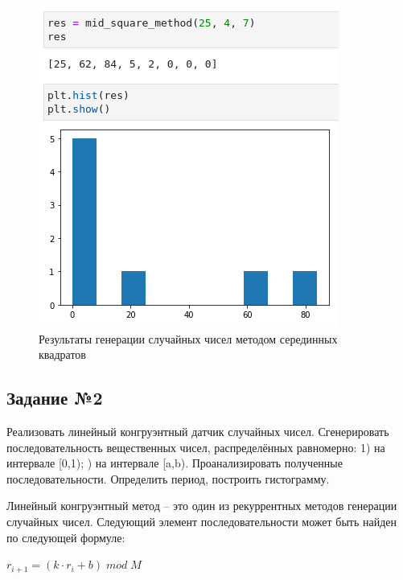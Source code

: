 \documentclass[14pt,fleqn]{extarticle}
\begin{document}
    \begin{figure}[h]
        \centering \includegraphics[scale=0.8]{result1}
        \caption{Результаты генерации случайных чисел методом серединных квадратов}
        \label{fig:mid_square_method_result}
    \end{figure}
    
    \subsection*{Задание №2}
    Реализовать линейный конгруэнтный датчик случайных чисел. Сгенерировать последовательность вещественных чисел, распределённых равномерно: 1) на интервале [0,1); ) на интервале [a,b). Проанализировать полученные последовательности. Определить период, построить гистограмму.\\
    \newline

    Линейный конгруэнтный метод -- это один из рекуррентных методов генерации случайных чисел. Следующий элемент последовательности может быть найден по следующей формуле:
    \begin{center}
        $ r_{i+1} = (k \cdot r_i + b) \; mod \; M$
    \end{center}
    
\end{document}
